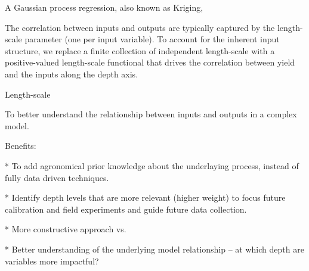 A Gaussian process regression, also known as Kriging, 

The correlation between inputs and outputs are typically captured by
the length-scale parameter (one per input variable). To account for
the inherent input structure, we replace a finite collection of
independent length-scale with a positive-valued length-scale
functional that drives the correlation between yield and the inputs
along the depth axis.

Length-scale

To better understand the relationship between inputs and outputs in a
complex model.

Benefits:

* To add agronomical prior knowledge about the underlaying process,
instead of fully data driven techniques.

* Identify depth levels that are more relevant (higher weight) to
focus future calibration and field experiments and guide future data
collection.

* More constructive approach vs.

* Better understanding of the underlying model relationship -- at
which depth are variables more impactful?

